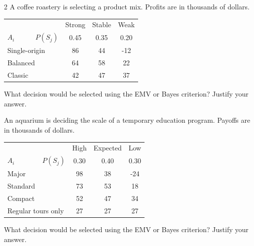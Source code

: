 \begin{multicols}{2}
		A coffee roastery is selecting a product mix. Profits are in thousands of dollars.\vspace{-3mm}
		\begin{center}\setlength{\tabcolsep}{2pt}\renewcommand{\arraystretch}{1.1}
			\begin{tabular}{lccc}\toprule
			&Strong&Stable&Weak\\
			$A_i \qquad \quad P(S_j)$&0.45&0.35&0.20\\ \midrule
			Single-origin&86&44&-12\\
			Balanced&64&58&22\\
			Classic&42&47&37\\ \bottomrule
			\end{tabular}
		\end{center}\vspace{-3mm}
		What decision would be selected using the EMV or Bayes criterion? Justify your answer.\vspace{-3mm}

		An aquarium is deciding the scale of a temporary education program. Payoffs are in thousands of dollars.\vspace{-3mm}
		\begin{center}\setlength{\tabcolsep}{2pt}\renewcommand{\arraystretch}{1.1}
			\begin{tabular}{lccc}\toprule
			&High&Expected&Low\\
			$A_i \qquad \qquad P(S_j)$&0.30&0.40&0.30\\ \midrule
			Major&98&38&-24\\
			Standard&73&53&18\\
			Compact&52&47&34\\
			Regular tours only&27&27&27\\ \bottomrule
			\end{tabular}
		\end{center}\vspace{-3mm}
		What decision would be selected using the EMV or Bayes criterion? Justify your answer.\vspace{-3mm}


\end{multicols}
